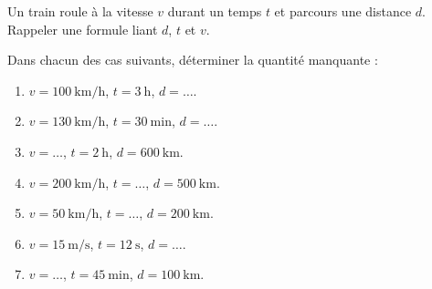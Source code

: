
\begin{exercice}\label{exosmath-0943}

    Un train roule à la vitesse \( v\) durant un temps \( t\) et parcours une distance \( d\). Rappeler une formule liant \( d\), \( t\) et \( v\).

    Dans chacun des cas suivants, déterminer la quantité manquante :
    \begin{enumerate}
        \item
            \( v=\SI{100}{\kilo\meter\per\hour}\), \( t=\SI{3}{\hour}\), \( d=\ldots\).
        \item
            \( v=\SI{130}{\kilo\meter\per\hour}\), \( t=\SI{30}{\minute}\), \( d=\ldots\).
        \item
            \( v=\ldots\), \( t=\SI{2}{\hour}\), \( d=\SI{600}{\kilo\meter}\).
        \item
            \( v=\SI{200}{\kilo\meter\per\hour}\), \( t=\ldots\), \( d=\SI{500}{\kilo\meter}\).
        \item
            \( v=\SI{50}{\kilo\meter\per\hour}\), \( t=\ldots\), \( d=\SI{200}{\kilo\meter}\).
        \item
            \( v=\SI{15}{\meter\per\second}\), \( t=\SI{12}{\second}\), \( d=\ldots\).
        \item
            \( v=\ldots\), \( t=\SI{45}{\minute}\), \( d=\SI{100}{\kilo\meter}\).
    \end{enumerate}

\end{exercice}
